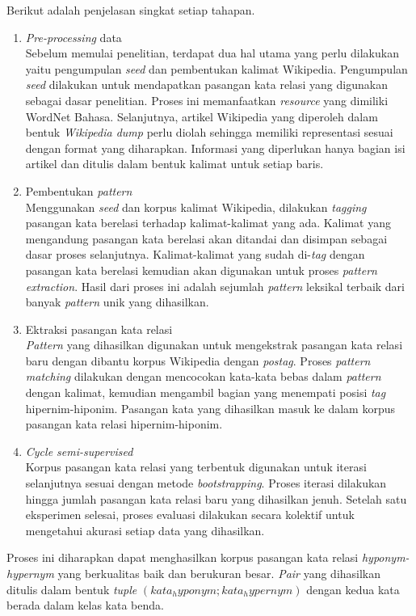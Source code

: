 \noindent Berikut adalah penjelasan singkat setiap tahapan.
\begin{enumerate}
  \item \textit{Pre-processing} data \\
  Sebelum memulai penelitian, terdapat dua hal utama yang perlu dilakukan yaitu pengumpulan \textit{seed} dan pembentukan kalimat Wikipedia. Pengumpulan \textit{seed} dilakukan untuk mendapatkan pasangan kata relasi yang digunakan sebagai dasar penelitian. Proses ini memanfaatkan \textit{resource} yang dimiliki WordNet Bahasa. Selanjutnya, artikel Wikipedia yang diperoleh dalam bentuk \textit{Wikipedia dump} perlu diolah sehingga memiliki representasi sesuai dengan format yang diharapkan. Informasi yang diperlukan hanya bagian isi artikel dan ditulis dalam bentuk kalimat untuk setiap baris.
  \item Pembentukan \textit{pattern} \\
  Menggunakan \textit{seed} dan korpus kalimat Wikipedia, dilakukan \textit{tagging} pasangan kata berelasi terhadap kalimat-kalimat yang ada. Kalimat yang mengandung pasangan kata berelasi akan ditandai dan disimpan sebagai dasar proses selanjutnya. Kalimat-kalimat yang sudah di-\textit{tag} dengan pasangan kata berelasi kemudian akan digunakan untuk proses \textit{pattern extraction}. Hasil dari proses ini adalah sejumlah \textit{pattern} leksikal terbaik dari banyak \textit{pattern} unik yang dihasilkan.
  \item Ektraksi pasangan kata relasi \\
  \textit{Pattern} yang dihasilkan digunakan untuk mengekstrak pasangan kata relasi baru dengan dibantu korpus Wikipedia dengan \textit{postag}. Proses \textit{pattern matching} dilakukan dengan mencocokan kata-kata bebas dalam \textit{pattern} dengan kalimat, kemudian mengambil bagian yang menempati posisi \textit{tag} hipernim-hiponim. Pasangan kata yang dihasilkan masuk ke dalam korpus pasangan kata relasi hipernim-hiponim.
  \item \textit{Cycle semi-supervised} \\ 
  Korpus pasangan kata relasi yang terbentuk digunakan untuk iterasi selanjutnya sesuai dengan metode \textit{bootstrapping}. Proses iterasi dilakukan hingga jumlah pasangan kata relasi baru yang dihasilkan jenuh. Setelah satu eksperimen selesai, proses evaluasi dilakukan secara kolektif untuk mengetahui akurasi setiap data yang dihasilkan.
\end{enumerate}

Proses ini diharapkan dapat menghasilkan korpus pasangan kata relasi \textit{hyponym-hypernym} yang berkualitas baik dan berukuran besar. \textit{Pair} yang dihasilkan ditulis dalam bentuk \textit{tuple} $(kata_hyponym;kata_hypernym)$ dengan kedua kata berada dalam kelas kata benda.


